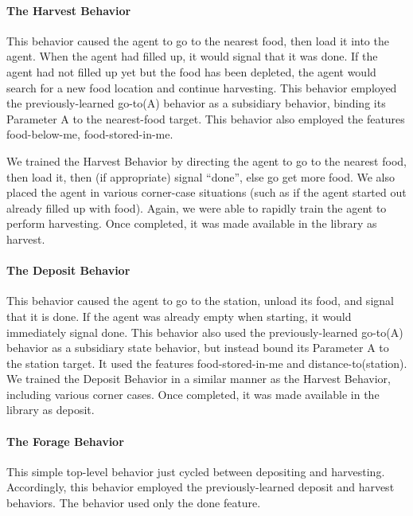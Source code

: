 \paragraph*{The Harvest Behavior} This behavior caused the agent to go to the nearest food, then load it into the agent.  When the agent had filled up, it would signal that it was done.  If the agent had not filled up yet but the food has been depleted, the agent would search for a new food location and continue harvesting.  This behavior employed the previously-learned \textsf{go-to(A)} behavior as a subsidiary behavior, binding its Parameter A to the \textsf{nearest-food} target.  This behavior also employed the features \textsf{food-below-me}, \textsf{food-stored-in-me}.

We trained the Harvest Behavior by directing the agent to go to the nearest food, then load it, then (if appropriate) signal ``done'', else go get more food.  We also placed the agent in various corner-case situations (such as if the agent started out already filled up with food).  Again, we were able to rapidly train the agent to perform harvesting.  Once completed, it was made available in the library as \textsf{harvest}.

\paragraph*{The Deposit Behavior} This behavior caused the agent to go to the station, unload its food, and signal that it is done.  If the agent was already empty when starting, it would immediately signal done.   This behavior also used the previously-learned \textsf{go-to(A)} behavior as a subsidiary state behavior, but instead bound its Parameter A to the \textsf{station} target.  It used the features \textsf{food-stored-in-me} and \textsf{distance-to(station)}.  We trained the Deposit Behavior in a similar manner as the Harvest Behavior, including various corner cases.  Once completed, it was made available in the library as \textsf{deposit}.

\paragraph*{The Forage Behavior} This simple top-level behavior just cycled between depositing and harvesting. Accordingly, this behavior employed the previously-learned \textsf{deposit} and \textsf{harvest} behaviors.  The behavior used only the \textsf{done} feature.

